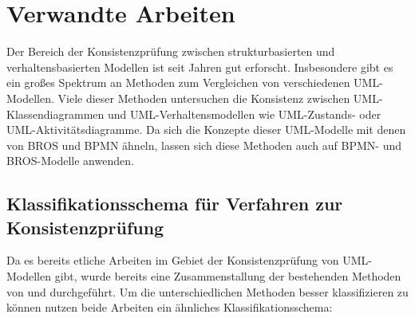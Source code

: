 \chapter{Verwandte Arbeiten}

Der Bereich der Konsistenzprüfung zwischen strukturbasierten und verhaltensbasierten Modellen ist seit Jahren gut erforscht.
Insbesondere gibt es ein großes Spektrum an Methoden zum Vergleichen von verschiedenen UML-Modellen.
Viele dieser Methoden untersuchen die Konsistenz zwischen UML-Klassendiagrammen und UML-Verhaltensmodellen wie UML-Zustands- oder UML-Aktivitätsdiagramme.
Da sich die Konzepte dieser UML-Modelle mit denen von BROS und BPMN ähneln, lassen sich diese Methoden auch auf BPMN- und BROS-Modelle anwenden.

\section{Klassifikationsschema für Verfahren zur Konsistenzprüfung}

Da es bereits etliche Arbeiten im Gebiet der Konsistenzprüfung von UML-Modellen gibt, wurde bereits eine Zusammenstallung der bestehenden Methoden von  \cite{Usman2008} und \cite{Lucas2009} durchgeführt.
Um die unterschiedlichen Methoden besser klassifizieren zu können nutzen beide Arbeiten ein ähnliches Klassifikationsschema:

